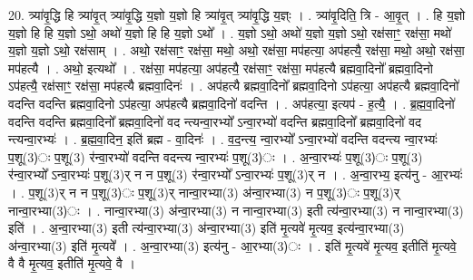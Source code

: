 \documentclass[17pt]{extarticle}
\begin{document}
20. त्र्या॑वृ॒द्धि हि त्र्या॑वृ॒त् त्र्या॑वृ॒द्धि य॒ज्ञो य॒ज्ञो हि त्र्या॑वृ॒त् त्र्या॑वृ॒द्धि य॒ज्ञ्ः । . त्र्या॑वृ॒दिति॒ त्रि - आ॒वृ॒त् । . हि य॒ज्ञो य॒ज्ञो हि हि य॒ज्ञो ऽथो॒ अथो॑ य॒ज्ञो हि हि य॒ज्ञो ऽथो᳚ । . य॒ज्ञो ऽथो॒ अथो॑ य॒ज्ञो य॒ज्ञो ऽथो॒ रक्ष॑साꣳ॒॒ रक्ष॑सा॒ मथो॑ य॒ज्ञो य॒ज्ञो ऽथो॒ रक्ष॑साम् । . अथो॒ रक्ष॑साꣳ॒॒ रक्ष॑सा॒ मथो॒ अथो॒ रक्ष॑सा॒ मप॑हत्या॒ अप॑हत्यै॒ रक्ष॑सा॒ मथो॒ अथो॒ रक्ष॑सा॒ मप॑हत्यै । . अथो॒ इत्यथो᳚ । . रक्ष॑सा॒ मप॑हत्या॒ अप॑हत्यै॒ रक्ष॑साꣳ॒॒ रक्ष॑सा॒ मप॑हत्यै ब्रह्मवा॒दिनो᳚ ब्रह्मवा॒दिनो ऽप॑हत्यै॒ रक्ष॑साꣳ॒॒ रक्ष॑सा॒ मप॑हत्यै ब्रह्मवा॒दिनः॑ । . अप॑हत्यै ब्रह्मवा॒दिनो᳚ ब्रह्मवा॒दिनो ऽप॑हत्या॒ अप॑हत्यै ब्रह्मवा॒दिनो॑ वदन्ति वदन्ति ब्रह्मवा॒दिनो ऽप॑हत्या॒ अप॑हत्यै ब्रह्मवा॒दिनो॑ वदन्ति । . अप॑हत्या॒ इत्यप॑ - ह॒त्यै॒ । . ब्र॒ह्म॒वा॒दिनो॑ वदन्ति वदन्ति ब्रह्मवा॒दिनो᳚ ब्रह्मवा॒दिनो॑ वद न्त्यन्वा॒रभ्यो᳚ ऽन्वा॒रभ्यो॑ वदन्ति ब्रह्मवा॒दिनो᳚ ब्रह्मवा॒दिनो॑ वद न्त्यन्वा॒रभ्यः॑ । . ब्र॒ह्म॒वा॒दिन॒ इति॑ ब्रह्म - वा॒दिनः॑ । . व॒द॒न्त्य॒ न्वा॒रभ्यो᳚ ऽन्वा॒रभ्यो॑ वदन्ति वदन्त्य न्वा॒रभ्यः॑ प॒शू(3)ः प॒शू(3) र॑न्वा॒रभ्यो॑ वदन्ति वदन्त्य न्वा॒रभ्यः॑ प॒शू(3)ः । . अ॒न्वा॒रभ्यः॑ प॒शू(3)ः प॒शू(3) र॑न्वा॒रभ्यो᳚ ऽन्वा॒रभ्यः॑ प॒शू(3)र् न न प॒शू(3) र॑न्वा॒रभ्यो᳚ ऽन्वा॒रभ्यः॑ प॒शू(3)र् न । . अ॒न्वा॒रभ्य॒ इत्य॑नु - आ॒रभ्यः॑ । . प॒शू(3)र् न न प॒शू(3)ः प॒शू(3)र् नान्वा॒रभ्या(3) अ॑न्वा॒रभ्या(3) न प॒शू(3)ः प॒शू(3)र् नान्वा॒रभ्या(3)ः । . नान्वा॒रभ्या(3) अ॑न्वा॒रभ्या(3) न नान्वा॒रभ्या(3) इती त्य॑न्वा॒रभ्या(3) न नान्वा॒रभ्या(3) इति॑ । . अ॒न्वा॒रभ्या(3) इती त्य॑न्वा॒रभ्या(3) अ॑न्वा॒रभ्या(3) इति॑ मृ॒त्यवे॑ मृ॒त्यव॒ इत्य॑न्वा॒रभ्या(3) अ॑न्वा॒रभ्या(3) इति॑ मृ॒त्यवे᳚ । . अ॒न्वा॒रभ्या(3) इत्य॑नु - आ॒रभ्या(3)ः । . इति॑ मृ॒त्यवे॑ मृ॒त्यव॒ इतीति॑ मृ॒त्यवे॒ वै वै मृ॒त्यव॒ इतीति॑ मृ॒त्यवे॒ वै । \newline
\end{document}
